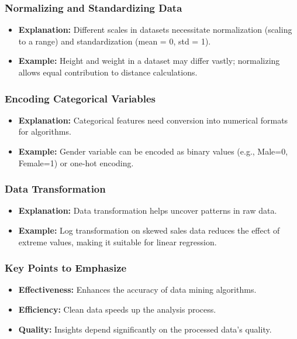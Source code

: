 \documentclass[aspectratio=169]{beamer}
\begin{document}
\begin{frame}[fragile]
    \frametitle{Normalizing and Standardizing Data}
    \begin{itemize}
        \item \textbf{Explanation:} Different scales in datasets necessitate normalization (scaling to a range) and standardization (mean = 0, std = 1).
        \item \textbf{Example:} Height and weight in a dataset may differ vastly; normalizing allows equal contribution to distance calculations.
    \end{itemize}
\end{frame}

\begin{frame}[fragile]
    \frametitle{Encoding Categorical Variables}
    \begin{itemize}
        \item \textbf{Explanation:} Categorical features need conversion into numerical formats for algorithms.
        \item \textbf{Example:} Gender variable can be encoded as binary values (e.g., Male=0, Female=1) or one-hot encoding.
    \end{itemize}
\end{frame}

\begin{frame}[fragile]
    \frametitle{Data Transformation}
    \begin{itemize}
        \item \textbf{Explanation:} Data transformation helps uncover patterns in raw data.
        \item \textbf{Example:} Log transformation on skewed sales data reduces the effect of extreme values, making it suitable for linear regression.
    \end{itemize}
\end{frame}

\begin{frame}[fragile]
    \frametitle{Key Points to Emphasize}
    \begin{itemize}
        \item \textbf{Effectiveness:} Enhances the accuracy of data mining algorithms.
        \item \textbf{Efficiency:} Clean data speeds up the analysis process.
        \item \textbf{Quality:} Insights depend significantly on the processed data's quality.
    \end{itemize}
\end{frame}
\end{document}
